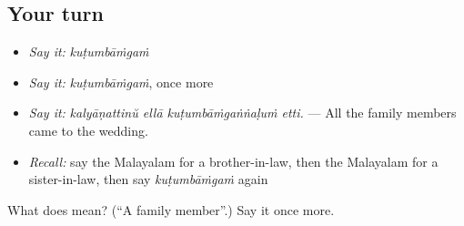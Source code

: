 \subsection*{Your turn}
\begin{itemize}
\raggedright
  \item \emph{Say it:} \emph{kuṭumbāṁgaṁ}
  \item \emph{Say it:} \emph{kuṭumbāṁgaṁ}, once more
  \item \emph{Say it:} \emph{kalyāṇattinŭ ellā kuṭumbāṁgaṅṅaḷuṁ etti.} — All the family members came to the wedding.
  \item \emph{Recall:} say the Malayalam for a brother-in-law, then the Malayalam for a sister-in-law, then say \emph{kuṭumbāṁgaṁ} again
\end{itemize}

\begin{tcolorbox}[breakable,colback=teal!4,colframe=teal!35!black,title={Before you move on}]
What does  mean? (\textquotedblleft{}A family member\textquotedblright{}.) Say it once more.
\end{tcolorbox}
